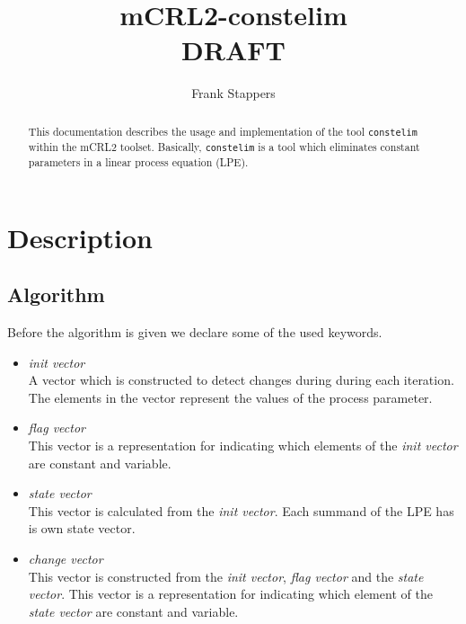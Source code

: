 \documentclass[a4paper,9pt]{article}
\title{mCRL2-constelim \\ DRAFT}
\author{Frank Stappers}
\begin{document}
\maketitle

\begin{abstract}
This documentation describes the usage and implementation of  the tool \verb"constelim" within the mCRL2 toolset. 
Basically, \verb"constelim" is a tool which eliminates constant parameters in a linear process equation (LPE).
\end{abstract}

\section{Description} \label{sec:dec}

\subsection{Algorithm}
Before the algorithm is given we declare some of the used keywords.
\begin{itemize}
\item \textit{init vector} \\ A vector which is constructed to detect changes during during each iteration. 
 The elements in the vector represent the values of the process parameter.
\item \textit{flag vector} \\ This vector is a representation for indicating which elements of the \textit{init vector} 
are constant and variable. 
\item \textit{state vector} \\ This vector is calculated from the \textit{init vector}. 
Each summand of the LPE has is own state vector.
\item \textit{change vector} \\ This vector is constructed from the \textit{init vector}, \textit{flag vector} 
and the \textit{state vector}. This vector is a representation for indicating which element of the \textit{state vector}
are constant and variable. 
\end{itemize}
\end{document}
